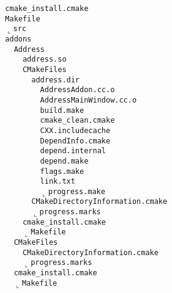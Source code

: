\documentclass[german,a4paper]{report}
\begin{document}
\begin{alltt}
\textbar\ \  \textbar\textendash\textendash cmake\_install.cmake
\textbar\ \  \textbar\textendash\textendash Makefile
\textbar\ \  \(\llcorner\)\textendash\textendash src
\textbar\ \      \textbar\textendash\textendash addons
\textbar\ \      \textbar\ \  \textbar\textendash\textendash Address
\textbar\ \      \textbar\ \  \textbar\ \  \textbar\textendash\textendash address.so
\textbar\ \      \textbar\ \  \textbar\ \  \textbar\textendash\textendash CMakeFiles
\textbar\ \      \textbar\ \  \textbar\ \  \textbar\ \  \textbar\textendash\textendash address.dir
\textbar\ \      \textbar\ \  \textbar\ \  \textbar\ \  \textbar\ \  \textbar\textendash\textendash AddressAddon.cc.o
\textbar\ \      \textbar\ \  \textbar\ \  \textbar\ \  \textbar\ \  \textbar\textendash\textendash AddressMainWindow.cc.o
\textbar\ \      \textbar\ \  \textbar\ \  \textbar\ \  \textbar\ \  \textbar\textendash\textendash build.make
\textbar\ \      \textbar\ \  \textbar\ \  \textbar\ \  \textbar\ \  \textbar\textendash\textendash cmake_clean.cmake
\textbar\ \      \textbar\ \  \textbar\ \  \textbar\ \  \textbar\ \  \textbar\textendash\textendash CXX.includecache
\textbar\ \      \textbar\ \  \textbar\ \  \textbar\ \  \textbar\ \  \textbar\textendash\textendash DependInfo.cmake
\textbar\ \      \textbar\ \  \textbar\ \  \textbar\ \  \textbar\ \  \textbar\textendash\textendash depend.internal
\textbar\ \      \textbar\ \  \textbar\ \  \textbar\ \  \textbar\ \  \textbar\textendash\textendash depend.make
\textbar\ \      \textbar\ \  \textbar\ \  \textbar\ \  \textbar\ \  \textbar\textendash\textendash flags.make
\textbar\ \      \textbar\ \  \textbar\ \  \textbar\ \  \textbar\ \  \textbar\textendash\textendash link.txt
\textbar\ \      \textbar\ \  \textbar\ \  \textbar\ \  \textbar\ \  \(\llcorner\)\textendash\textendash progress.make
\textbar\ \      \textbar\ \  \textbar\ \  \textbar\ \  \textbar\textendash\textendash CMakeDirectoryInformation.cmake
\textbar\ \      \textbar\ \  \textbar\ \  \textbar\ \  \(\llcorner\)\textendash\textendash progress.marks
\textbar\ \      \textbar\ \  \textbar\ \  \textbar\textendash\textendash cmake\_install.cmake
\textbar\ \      \textbar\ \  \textbar\ \  \(\llcorner\)\textendash\textendash Makefile
\textbar\ \      \textbar\ \  \textbar\textendash\textendash CMakeFiles
\textbar\ \      \textbar\ \  \textbar\ \  \textbar\textendash\textendash CMakeDirectoryInformation.cmake
\textbar\ \      \textbar\ \  \textbar\ \  \(\llcorner\)\textendash\textendash progress.marks
\textbar\ \      \textbar\ \  \textbar\textendash\textendash cmake\_install.cmake
\textbar\ \      \textbar\ \  \(\llcorner\)\textendash\textendash Makefile

\end{alltt}
\end{document}
